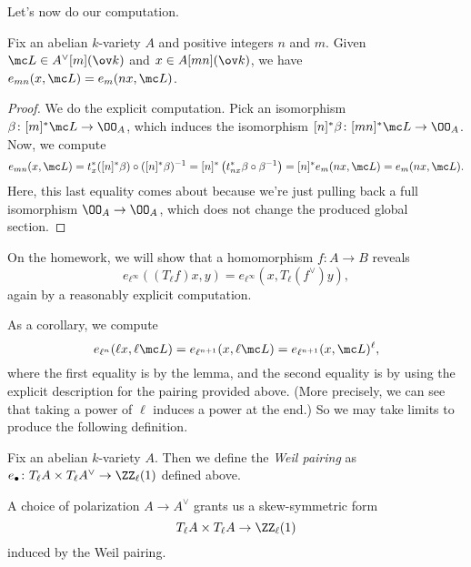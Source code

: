 \documentclass[../notes.tex]{subfiles}
\begin{document}
Let's now do our computation.
\begin{lemma}
	Fix an abelian $k$-variety $A$ and positive integers $n$ and $m$. Given $\mc L\in A^\lor[m](\ov k)$ and $x\in A[mn](\ov k)$, we have $e_{mn}(x,\mc L)=e_m(nx,\mc L)$.
\end{lemma}
\begin{proof}
	We do the explicit computation. Pick an isomorphism $\beta\colon[m]^*\mc L\to\OO_A$, which induces the isomorphism $[n]^*\beta\colon[mn]^*\mc L\to\OO_A$. Now, we compute
	\[e_{mn}(x,\mc L)=t_x^*([n]^*\beta)\circ([n]^*\beta)^{-1}=[n]^*\left(t_{nx}^*\beta\circ\beta^{-1}\right)=[n]^*e_m(nx,\mc L)=e_m(nx,\mc L).\]
	Here, this last equality comes about because we're just pulling back a full isomorphism $\OO_A\to\OO_A$, which does not change the produced global section.
\end{proof}
\begin{remark} \label{rem:functorial-weil-pairing}
	On the homework, we will show that a homomorphism $f\colon A\to B$ reveals
	\[e_{\ell^\infty}((T_\ell f)x,y)=e_{\ell^\infty}(x,T_\ell(f^\lor)y),\]
	again by a reasonably explicit computation.
\end{remark}
As a corollary, we compute
\[e_{\ell^{n}}(\ell x,\ell\mc L)=e_{\ell^{n+1}}(x,\ell\mc L)=e_{\ell^{n+1}}(x,\mc L)^{\ell},\]
where the first equality is by the lemma, and the second equality is by using the explicit description for the pairing provided above. (More precisely, we can see that taking a power of $\ell$ induces a power at the end.) So we may take limits to produce the following definition.
\begin{definition}
	Fix an abelian $k$-variety $A$. Then we define the \textit{Weil pairing} as $e_\bullet\colon T_\ell A\times T_\ell A^\lor\to\ZZ_\ell(1)$ defined above.
\end{definition}
\begin{remark}
	A choice of polarization $A\to A^\lor$ grants us a skew-symmetric form
	\[T_\ell A\times T_\ell A\to\ZZ_\ell(1)\]
	induced by the Weil pairing.
\end{remark}
\end{document}
